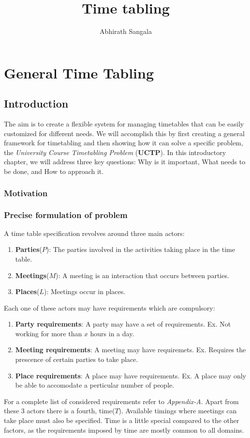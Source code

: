 \documentclass[11pt]{book}
\title {\textbf{Time tabling}}
\author {Abhirath Sangala}
\date{}
\begin{document}
\maketitle

\tableofcontents

\part{General Time Tabling}

\chapter{Introduction}

The aim is to create a flexible system for managing timetables that can be easily customized for different needs. We will accomplish this by first creating a general framework for timetabling and then showing how it can solve a specific problem, the \textit{University Course Timetabling Problem} (\textbf{UCTP}). In this introductory chapter, we will address three key questions: Why is it important, What needs to be done, and How to approach it.

\section{Motivation}

\section{Precise formulation of  problem}
A time table specification revolves around three main actors:
\begin{enumerate}

  \item \textbf{Parties}($P$): The parties involved in the activities taking place in the time table.
  \item \textbf{Meetings}($M$): A meeting is an interaction that occurs between parties.
  \item \textbf{Places}($L$): Meetings occur in places.
\end{enumerate}
Each one of these actors may have requirements which are compulsory:
\begin{enumerate}

  \item \textbf{Party requirements}: A party may have a set of requirements. Ex. Not working for more than $x$ hours in a day.
  \item \textbf{Meeting requirements}: A meeting may have requiremets. Ex. Requires the prescence of certain parties to take place.
  \item \textbf{Place requirements}:  A place may have requirements. Ex. A place may only be able to accomodate a perticular number of people.
\end{enumerate}
For a complete list of considered requirements refer to \textit{Appendix-A}. Apart from these 3 actors there is a fourth, time($T$). Available timings where meetings can take place must also be specified. Time is a little special compared to the other factors, as the requirements imposed by time are mostly common to all domains.
\end{document}

